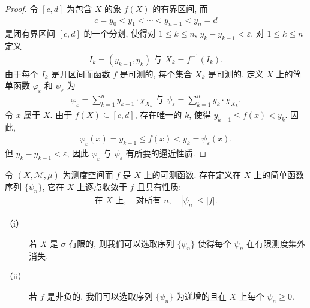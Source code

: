 \documentclass[../../main.tex]{subfiles}
\begin{document}
\begin{proof}
令 $[c,d]$ 为包含 $X$ 的象 $f(X)$ 的有界区间, 而
\begin{align*}
c=y_{0}<y_{1}<\cdots<y_{n-1}<y_{n}=d
\end{align*}
是闭有界区间 $[c,d]$ 的一个分划, 使得对 $1\leqslant k\leqslant n$, $y_{k}-y_{k-1}<\varepsilon$. 对 $1\leqslant k\leqslant n$ 定义
\begin{align*}
I_{k}=(y_{k-1},y_{k})\text{ 与 }X_{k}=f^{-1}(I_{k}).
\end{align*}
由于每个 $I_{k}$ 是开区间而函数 $f$ 是可测的, 每个集合 $X_{k}$ 是可测的. 定义 $X$ 上的简单函数 $\varphi_{\varepsilon}$ 和 $\psi_{\varepsilon}$ 为
\begin{align*}
\varphi_{\varepsilon}=\sum_{k=1}^{n}y_{k-1}\cdot\chi_{X_{k}}\text{ 与 }\psi_{\varepsilon}=\sum_{k=1}^{n}y_{k}\cdot\chi_{X_{k}}.
\end{align*}
令 $x$ 属于 $X$. 由于 $f(X)\subseteq[c,d]$, 存在唯一的 $k$, 使得 $y_{k-1}\leqslant f(x)<y_{k}$. 因此,
\begin{align*}
\varphi_{\varepsilon}(x)=y_{k-1}\leqslant f(x)<y_{k}=\psi_{\varepsilon}(x).
\end{align*}
但 $y_{k}-y_{k-1}<\varepsilon$, 因此 $\varphi_{\varepsilon}$ 与 $\psi_{\varepsilon}$ 有所要的逼近性质.
\end{proof}

\begin{theorem}[简单逼近定理]\label{theorem:ch18-simple-approximation-thm}
令 $(X,\mathcal{M},\mu)$ 为测度空间而 $f$ 是 $X$ 上的可测函数. 存在定义在 $X$ 上的简单函数序列 $\{\psi_{n}\}$, 它在 $X$ 上逐点收敛于 $f$ 且具有性质:
\begin{align*}
\text{在 }X\text{ 上},\quad\text{对所有 }n,\quad|\psi_{n}|\leqslant|f|.
\end{align*}
\begin{description}
\item[（i）] 若 $X$ 是 $\sigma$ 有限的, 则我们可以选取序列 $\{\psi_{n}\}$ 使得每个 $\psi_{n}$ 在有限测度集外消失.
\item[（ii）] 若 $f$ 是非负的, 我们可以选取序列 $\{\psi_{n}\}$ 为递增的且在 $X$ 上每个 $\psi_{n}\geqslant 0$.
\end{description}
\end{theorem}
\end{document}
